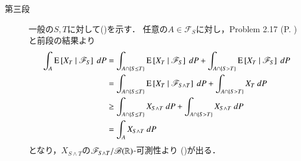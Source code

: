 \begin{prf}
\begin{description}
			\item[第三段]
				一般の$S,T$に対して()を示す．
				任意の$A \in \mathscr{F}_S$に対し，Problem 2.17 (P. \pageref{chapter_1_Problem_2_17})
				と前段の結果より
				\begin{align}
					\int_A \cexp{X_T}{\mathscr{F}_S}\ dP
					&= \int_{A \cap \{S \leq T\}} \cexp{X_T}{\mathscr{F}_S}\ dP
						+ \int_{A \cap \{S > T\}} \cexp{X_T}{\mathscr{F}_S}\ dP \\
					&= \int_{A \cap \{S \leq T\}} \cexp{X_T}{\mathscr{F}_{S \wedge T}}\ dP
						+ \int_{A \cap \{S > T\}} X_T\ dP \\
					&\geq \int_{A \cap \{S \leq T\}} X_{S \wedge T}\ dP
					 	+ \int_{A \cap \{S > T\}} X_{S \wedge T}\ dP \\
					&= \int_A X_{S \wedge T}\ dP
				\end{align}
				となり，$X_{S \wedge T}$の$\mathscr{F}_{S \wedge T}/\mathscr{B}(\mathbb{R})$-可測性より
				()が出る．
				\QED
		\end{description}
	\end{prf}
	
